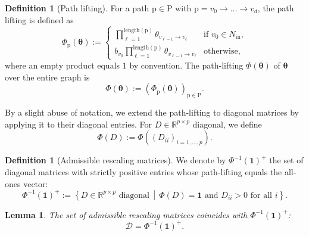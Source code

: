 \documentclass{article}
\theoremstyle{plain}
\newtheorem{lemma}[theorem]{Lemma}
\theoremstyle{definition}
\newtheorem{definition}[theorem]{Definition}
\theoremstyle{remark}
\def\Dcal{\mathcal{D}}
\def\path{{\mathrm{p}}}
\def\pathset{{\mathrm{P}}}
\def\Dcal{{\mathcal{D}}}
\begin{document}
{\begin{definition}[Path lifting]\citep[Definition A.2]{gonon2023path}
\label{def:path_lifting}
For a path $\path \in \pathset$ with $\path = v_0 \rightarrow \ldots \rightarrow v_d$, the path lifting is defined as 
\begin{equation}
    \Phi_\path(\boldsymbol{\theta}) := \begin{cases}
        \displaystyle\prod_{\ell=1}^{\text{length}(\path)} \theta_{v_{\ell-1} \rightarrow v_\ell} & \text{if } v_0 \in N_{\text{in}}, \\[0.5em]
        \displaystyle b_{v_0} \prod_{\ell=1}^{\text{length}(\path)} \theta_{v_{\ell-1} \rightarrow v_\ell} & \text{otherwise},
    \end{cases}
\end{equation}
where an empty product equals $1$ by convention. 
The path-lifting $\Phi(\boldsymbol{\theta})$ of $\boldsymbol{\theta}$ over the entire graph is
\begin{equation}
    \Phi(\boldsymbol{\theta}) := \left(\Phi_\path(\boldsymbol{\theta})\right)_{\path \in \pathset}.
\end{equation}


\end{definition}

By a slight abuse of notation, we extend the path-lifting to diagonal matrices by applying it to their diagonal entries. For $D \in \mathbb{R}^{p \times p}$ diagonal, we define
\begin{equation}
    \Phi(D) := \Phi\left((D_{ii})_{i=1,\ldots, p}\right).
\end{equation}

\begin{definition}[Admissible rescaling matrices]
\label{def:admissible_rescaling}
We denote by $\Phi^{-1}(\mathbf{1})^+$ the set of diagonal matrices with strictly positive entries whose path-lifting equals the all-ones vector:
\begin{equation}
    \Phi^{-1}(\mathbf{1})^+ := \left\{ D \in \mathbb{R}^{p \times p} \text{ diagonal} \,\middle|\, \Phi(D) = \mathbf{1} \text{ and } D_{ii} > 0 \text{ for all } i \right\}.
\end{equation}
\end{definition}

\begin{lemma}
\label{lemma:dcal_characterization}
The set of admissible rescaling matrices coincides with $\Phi^{-1}(\mathbf{1})^+$:
\begin{equation}
    \Dcal = \Phi^{-1}(\mathbf{1})^+.
\end{equation}
\end{lemma}

}
\end{document}

